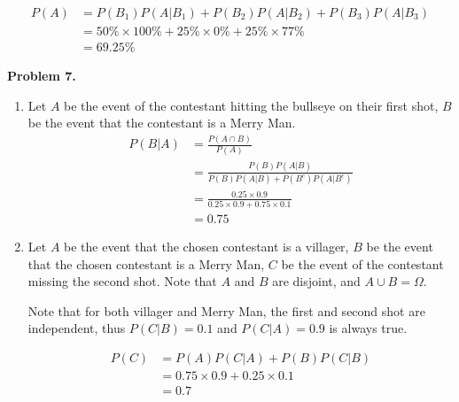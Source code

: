 \documentclass{article}
\begin{document}
\begin{align}
    P(A) & = P(B_1)P(A | B_1) + P(B_2)P(A | B_2) + P(B_3)P(A | B_3) \\
    & = 50\% \times 100\% + 25\% \times 0\% + 25\% \times 77\% \\
    & = 69.25\%
\end{align}
\pagebreak

\textbf{Problem 7.}
\begin{enumerate}[label={(\alph*)}]
    \item 
    Let $A$ be the event of the contestant hitting the bullseye on their first shot, $B$ be the event that the contestant is a Merry Man.
    \begin{align}
        P(B | A) & = \frac{P(A \cap B)}{P(A)} \\
        & = \frac{P(B)P(A|B)}{P(B)P(A | B) + P(B^c)P(A | B^c)} \\
        & = \frac{0.25 \times 0.9}{0.25 \times 0.9 + 0.75 \times 0.1} \\
        & = 0.75
    \end{align}

    \item 
    Let $A$ be the event that the chosen contestant is a villager, $B$ be the event that the chosen contestant is a Merry Man, $C$ be the event of the contestant missing the second shot.
    Note that $A$ and $B$ are disjoint, and $A \cup B = \Omega$.
    
    Note that for both villager and Merry Man, the first and second shot are independent, thus $P(C | B) = 0.1$ and $P(C | A) = 0.9$ is always true.

    \begin{align}
        P(C) & = P(A)P(C | A) + P(B)P(C | B) \\
        & = 0.75 \times 0.9 + 0.25 \times 0.1 \\ 
        & = 0.7
    \end{align}
\end{enumerate}
\end{document}
